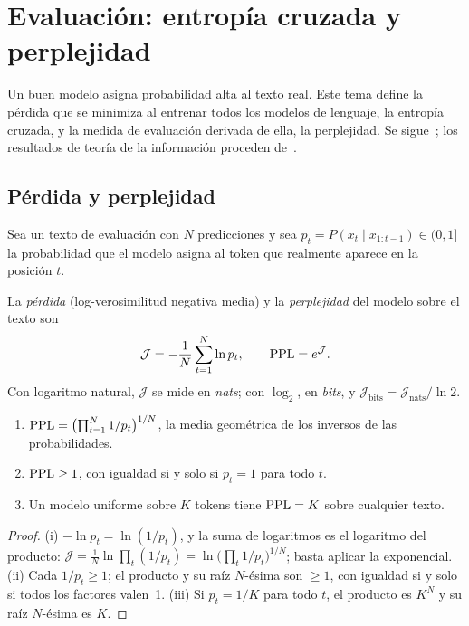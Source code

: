 \chapter{Evaluación: entropía cruzada y perplejidad}
\label{tema:5}

Un buen modelo asigna probabilidad alta al texto real. Este tema define la pérdida que se minimiza al entrenar todos los modelos de lenguaje, la entropía cruzada, y la medida de evaluación derivada de ella, la perplejidad. Se sigue~\cite[§3.2, §3.3 y §3.7]{jm3}; los resultados de teoría de la información proceden de~\cite[cap.~2]{ct}.

\section{Pérdida y perplejidad}

Sea un texto de evaluación con $N$ predicciones y sea $p_t=P(x_t\mid x_{1:t-1})\in(0,1]$ la probabilidad que el modelo asigna al token que realmente aparece en la posición $t$.

\begin{definicion}\label{def:ppl}
La \emph{pérdida} (log-verosimilitud negativa media) y la \emph{perplejidad} del modelo sobre el texto son
\[
\mathcal{J}=-\frac{1}{N}\sum_{t=1}^{N}\ln p_t,\qquad \operatorname{PPL}=e^{\mathcal{J}}.
\]
Con logaritmo natural, $\mathcal{J}$ se mide en \emph{nats}; con $\log_2$, en \emph{bits}, y $\mathcal{J}_{\text{bits}}=\mathcal{J}_{\text{nats}}/\ln 2$.
\end{definicion}

\begin{proposicion}\label{prop:ppl}
\begin{enumerate}
  \item $\operatorname{PPL}=\bigl(\prod_{t=1}^{N}1/p_t\bigr)^{1/N}$, la media geométrica de los inversos de las probabilidades.
  \item $\operatorname{PPL}\ge 1$, con igualdad si y solo si $p_t=1$ para todo $t$.
  \item Un modelo uniforme sobre $K$ tokens tiene $\operatorname{PPL}=K$ sobre cualquier texto.
\end{enumerate}
\end{proposicion}

\begin{proof}
(i) $-\ln p_t=\ln(1/p_t)$, y la suma de logaritmos es el logaritmo del producto: $\mathcal{J}=\frac1N\ln\prod_t(1/p_t)=\ln\bigl(\prod_t 1/p_t\bigr)^{1/N}$; basta aplicar la exponencial. (ii) Cada $1/p_t\ge 1$; el producto y su raíz $N$-ésima son $\ge 1$, con igualdad si y solo si todos los factores valen~1. (iii) Si $p_t=1/K$ para todo $t$, el producto es $K^{N}$ y su raíz $N$-ésima es $K$.
\end{proof}

